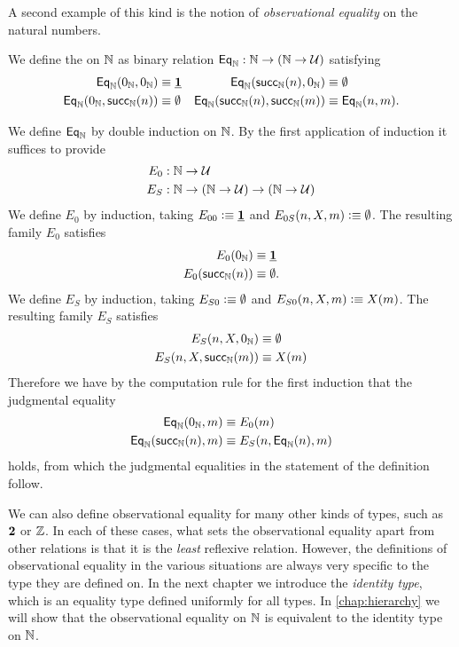 A second example of this kind is the notion of \emph{observational equality} on the natural numbers.

\begin{defn}\label{defn:obs_nat}
We define the  on ${\mathbb{N}}$ as binary relation $\mathsf{Eq}_{\mathbb{N}}:{\mathbb{N}}\to({\mathbb{N}}\to\mathcal{U})$ satisfying
\begin{align*}
\mathsf{Eq}_{\mathbb{N}}(0_{{\mathbb{N}}},0_{{\mathbb{N}}}) & \equiv \underline{\mathbf{1}} & \mathsf{Eq}_{\mathbb{N}}(\mathsf{succ}_{{\mathbb{N}}}(n),0_{{\mathbb{N}}}) & \equiv \emptyset \\
\mathsf{Eq}_{\mathbb{N}}(0_{{\mathbb{N}}},\mathsf{succ}_{{\mathbb{N}}}(n)) & \equiv \emptyset & \mathsf{Eq}_{\mathbb{N}}(\mathsf{succ}_{{\mathbb{N}}}(n),\mathsf{succ}_{{\mathbb{N}}}(m)) & \equiv \mathsf{Eq}_{\mathbb{N}}(n,m).
\end{align*}
\end{defn}

\begin{constr}
We define $\mathsf{Eq}_{\mathbb{N}}$ by double induction on ${\mathbb{N}}$. By the first application of induction it suffices to provide
\begin{align*}
E_0 & : {\mathbb{N}}\to\mathcal{U} \\
E_S & : {\mathbb{N}}\to ({\mathbb{N}}\to\mathcal{U})\to({\mathbb{N}}\to\mathcal{U})
\end{align*}
We define $E_0$ by induction, taking $E_{00}\vcentcolon\equiv \underline{\mathbf{1}}$ and $E_{0S}(n,X,m)\vcentcolon\equiv \emptyset$. The resulting family $E_0$ satisfies
\begin{align*}
E_0(0_{{\mathbb{N}}}) & \equiv \underline{\mathbf{1}} \\
E_0(\mathsf{succ}_{{\mathbb{N}}}(n)) & \equiv \emptyset.
\end{align*} 
We define $E_S$ by induction, taking $E_{S0}\vcentcolon\equiv \emptyset$ and $E_{S0}(n,X,m)\vcentcolon\equiv X(m)$. The resulting family $E_S$ satisfies
\begin{align*}
E_S(n,X,0_{{\mathbb{N}}}) & \equiv \emptyset \\
E_S(n,X,\mathsf{succ}_{{\mathbb{N}}}(m)) & \equiv X(m) 
\end{align*}
Therefore we have by the computation rule for the first induction that the judgmental equality
\begin{align*}
\mathsf{Eq}_{\mathbb{N}}(0_{{\mathbb{N}}},m) & \equiv E_0(m) \\
\mathsf{Eq}_{\mathbb{N}}(\mathsf{succ}_{{\mathbb{N}}}(n),m) & \equiv E_S(n,\mathsf{Eq}_{\mathbb{N}}(n),m)
\end{align*}
holds, from which the judgmental equalities in the statement of the definition follow.
\end{constr}

We can also define observational equality for many other kinds of types, such as $\mathbf{2}$ or ${\mathbb{Z}}$. In each of these cases, what sets the observational equality apart from other relations is that it is the \emph{least} reflexive relation. However, the definitions of observational equality in the various situations are always very specific to the type they are defined on. In the next chapter we introduce the \emph{identity type}, which is an equality type defined uniformly for all types. In \cref{chap:hierarchy} we will show that the observational equality on ${\mathbb{N}}$ is equivalent to the identity type on ${\mathbb{N}}$.


